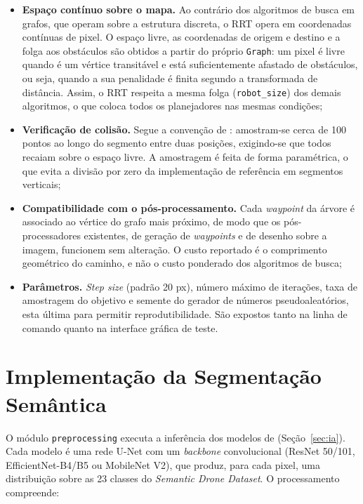 \documentclass[
    12pt,
    openright,
    oneside,
    a4paper,
    english,
    brazil
]{abntex2}
\begin{document}
\begin{itemize}
    \item \textbf{Espaço contínuo sobre o mapa.} Ao contrário dos algoritmos de busca em grafos, que operam sobre a estrutura discreta, o RRT opera em coordenadas contínuas de pixel. O espaço livre, as coordenadas de origem e destino e a folga aos obstáculos são obtidos a partir do próprio \texttt{Graph}: um pixel é livre quando é um vértice transitável e está suficientemente afastado de obstáculos, ou seja, quando a sua penalidade é finita segundo a transformada de distância. Assim, o RRT respeita a mesma folga (\texttt{robot\_\allowbreak{}size}) dos demais algoritmos, o que coloca todos os planejadores nas mesmas condições;
    \item \textbf{Verificação de colisão.} Segue a convenção de \cite{junior2025_rrt}: amostram-se cerca de 100 pontos ao longo do segmento entre duas posições, exigindo-se que todos recaiam sobre o espaço livre. A amostragem é feita de forma paramétrica, o que evita a divisão por zero da implementação de referência em segmentos verticais;
    \item \textbf{Compatibilidade com o pós-processamento.} Cada \textit{waypoint} da árvore é associado ao vértice do grafo mais próximo, de modo que os pós-processadores existentes, de geração de \textit{waypoints} e de desenho sobre a imagem, funcionem sem alteração. O custo reportado é o comprimento geométrico do caminho, e não o custo ponderado dos algoritmos de busca;
    \item \textbf{Parâmetros.} \textit{Step size} (padrão 20 px), número máximo de iterações, taxa de amostragem do objetivo e semente do gerador de números pseudoaleatórios, esta última para permitir reprodutibilidade. São expostos tanto na linha de comando quanto na interface gráfica de teste.
\end{itemize}

\section{Implementação da Segmentação Semântica}
\label{sec:impl_segmentacao}

O módulo \texttt{preprocessing} executa a inferência dos modelos de \cite{junior2024_models} (Seção~\ref{sec:ia}). Cada modelo é uma rede U-Net \cite{ronneberger2015} com um \textit{backbone} convolucional (ResNet 50/101, EfficientNet-B4/B5 ou MobileNet V2), que produz, para cada pixel, uma distribuição sobre as 23 classes do \emph{Semantic Drone Dataset}. O processamento compreende:
\end{document}
